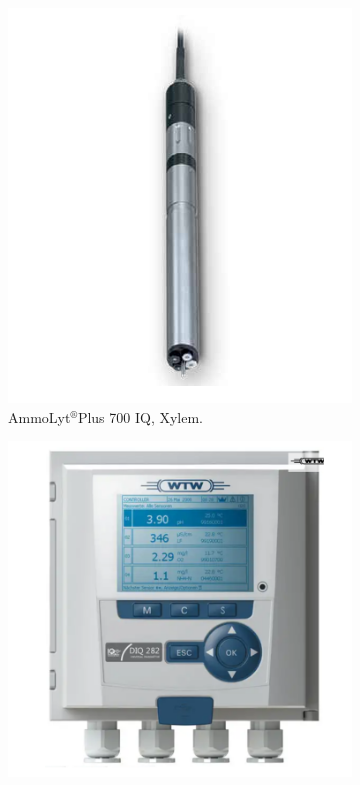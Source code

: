 \begin{figure}[h]
    \centering
    \begin{subfigure}{0.3\textwidth}
      \includegraphics[width=\linewidth]{imgs/instrument/ammonium-sensor.png}
      \caption{AmmoLyt$^\circledR$Plus 700 IQ, Xylem.} \label{fig:nh3-sensor-a}
    \end{subfigure}%
    \hspace{5em}%
    \begin{subfigure}{0.3\textwidth}
      \includegraphics[width=\linewidth]{imgs/instrument/controller-for-iq-sensor.png}

\end{subfigure}
\end{figure}
